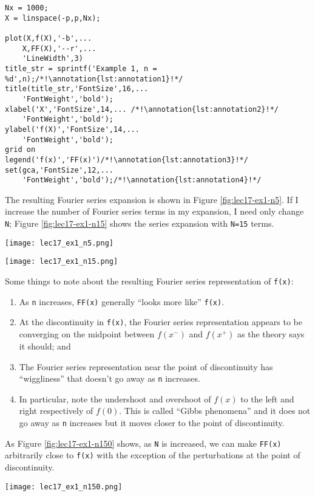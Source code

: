\begin{lstlisting}[name=lec17-ex1,style=myMatlab]
Nx = 1000;
X = linspace(-p,p,Nx);

plot(X,f(X),'-b',...
    X,FF(X),'--r',...
    'LineWidth',3)
title_str = sprintf('Example 1, n = %d',n);/*!\annotation{lst:annotation1}!*/
title(title_str,'FontSize',16,...
    'FontWeight','bold');
xlabel('X','FontSize',14,... /*!\annotation{lst:annotation2}!*/
    'FontWeight','bold');
ylabel('f(X)','FontSize',14,...
    'FontWeight','bold');
grid on
legend('f(x)','FF(x)')/*!\annotation{lst:annotation3}!*/
set(gca,'FontSize',12,...
    'FontWeight','bold');/*!\annotation{lst:annotation4}!*/
\end{lstlisting} \setcounter{lstannotation}{0}
The resulting Fourier series expansion is shown in Figure \ref{fig:lec17-ex1-n5}. If I increase the number of Fourier series terms in my expansion, I need only change \lstinline{N}; Figure \ref{fig:lec17-ex1-n15} shows the series expansion with \lstinline{N=15} terms.
\begin{marginfigure}
\texttt{[image: lec17\_ex1\_n5.png]}
\caption{Fourier series expansion with \lstinline{N=5}.}
\label{fig:lec17-ex1-n5}
\end{marginfigure}

\begin{marginfigure}
\texttt{[image: lec17\_ex1\_n15.png]}
\caption{Fourier series expansion with \lstinline{N=15}.}
\label{fig:lec17-ex1-n15}
\end{marginfigure} 
Some things to note about the resulting Fourier series representation of \lstinline{f(x)}:
\begin{enumerate}
\item As \lstinline{n} increases, \lstinline{FF(x)} generally ``looks more like'' \lstinline{f(x)}.  
\item At the discontinuity in \lstinline{f(x)}, the Fourier series representation appears to be converging on the midpoint between $f(x^-)$ and $f(x^+)$ as the theory says it should; and
\item The Fourier series representation near the point of discontinuity has ``wiggliness'' that doesn't go away as \lstinline{n} increases.
\item In particular, note the undershoot and overshoot of $f(x)$ to the left and right respectively of $f(0)$.  This is called ``Gibbs phenomena'' and it does not go away as \lstinline{n} increases but it moves closer to the point of discontinuity.  
\end{enumerate}
As Figure \ref{fig:lec17-ex1-n150} shows, as \lstinline{N} is increased, we can make \lstinline{FF(x)} arbitrarily close to \lstinline{f(x)} with the exception of the perturbations at the point of discontinuity.
\begin{marginfigure}
\texttt{[image: lec17\_ex1\_n150.png]}
\caption{Fourier series expansion with \lstinline{N=150}.}
\label{fig:lec17-ex1-n150}
\end{marginfigure}

